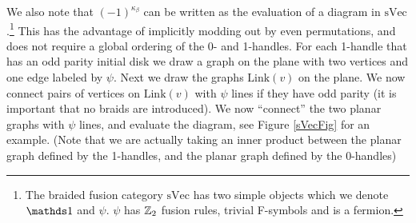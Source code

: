 We also note that $(-1)^{\kappa_\beta}$ can be written as the evaluation of a diagram in $\text{sVec}$.\footnote{The braided fusion category $\text{sVec}$ has two simple objects which we denote $\unit$ and $\psi$. 
$\psi$ has $\mathbb{Z}_2$ fusion rules, trivial F-symbols and is a fermion.}
This has the advantage of implicitly modding out by even permutations, and does not require a global ordering of the 0- and 1-handles. 
For each 1-handle that has an odd parity initial disk we draw a graph on the plane with two vertices and one edge labeled by $\psi$.
Next we draw the graphs $\text{Link}(v)$ on the plane. 
We now connect pairs of vertices on $\text{Link}(v)$ with $\psi$ lines if they have odd parity (it is important that no braids are introduced). 
We now ``connect'' the two planar graphs with $\psi$ lines, and evaluate the diagram, see Figure \ref{sVecFig} for an example.
(Note that we are actually taking an inner product between the planar graph defined by the 1-handles, and the planar graph defined by the 0-handles)


